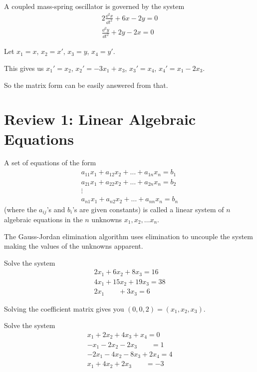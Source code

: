 \documentclass[../diffeq.tex]{subfiles}
\begin{document}
\begin{example}
    A coupled mass-spring oscillator is governed by the system 
    \begin{align*}
        2\frac{\dd^2 x}{\dd t^2}+6x-2y=0\\
        \frac{\dd^2 y}{\dd t^2}+2y-2x =0
    \end{align*}

    Let $x_1=x$, $x_2=x'$, $x_3=y$, $x_4=y'$.

    This gives us $x_1'=x_2$, $x_2'=-3x_1+x_3$, $x_3'=x_4$, $x_4'=x_1-2x_3$.

    So the matrix form can be easily answered from that.
\end{example}

\section{Review 1: Linear Algebraic Equations}
A set of equations of the form 
\begin{align*}
    a_{11}x_1+a_{12}x_2+\dots + a_{1n}x_n=b_1\\
    a_{21}x_1+a_{22}x_2+\dots + a_{2n}x_n=b_2\\
    \vdots \\
    a_{n1}x_1+a_{n2}x_2+\dots + a_{nn}x_n=b_n
\end{align*}
(where the $a_{ij}$'s and $b_i$'s are given constants) is called a linear system of $n$ algebraic equations in the $n$ unknowns $x_1,x_2,\dots x_n$.

The Gauss-Jordan elimination algorithm uses elimination to uncouple the system making the values of the unknowns apparent.
\begin{example}
    Solve the system 
    \begin{align*}
        2x_1+6x_2+8x_3=16\\
        4x_1+15x_2+19x_3=38\\
        2x_1 \qquad + 3x_3 = 6
    \end{align*}

    Solving the coefficient matrix gives you $(0,0,2)=(x_1,x_2,x_3)$.
\end{example}

\ex Solve the system 
\begin{align*}
    x_1+2x_2+4x_3+x_4=0\\
    -x_1-2x_2-2x_3 \qquad = 1\\
    -2x_1-4x_2-8x_3+2x_4=4\\
    x_1+4x_2+2x_3 \qquad = -3
\end{align*}
\end{document}
